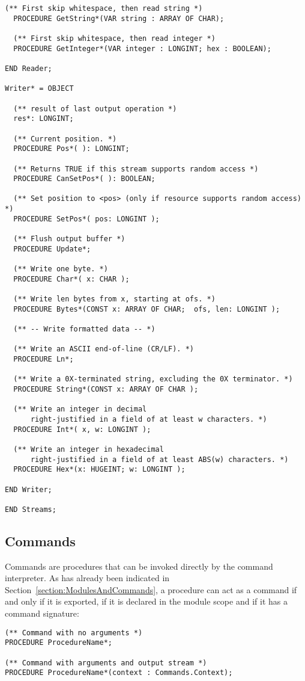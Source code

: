 \documentclass[a4paper,11pt]{article}
\begin{document}
\begin{lstlisting}[language=Oberon,frame=none,caption={Simplified Reader and Writer Interface}]
  (** First skip whitespace, then read string *)
  PROCEDURE GetString*(VAR string : ARRAY OF CHAR);

  (** First skip whitespace, then read integer *)
  PROCEDURE GetInteger*(VAR integer : LONGINT; hex : BOOLEAN);

END Reader;

Writer* = OBJECT

  (** result of last output operation *)
  res*: LONGINT;

  (** Current position. *)
  PROCEDURE Pos*( ): LONGINT;

  (** Returns TRUE if this stream supports random access *)
  PROCEDURE CanSetPos*( ): BOOLEAN;

  (** Set position to <pos> (only if resource supports random access) *)
  PROCEDURE SetPos*( pos: LONGINT );

  (** Flush output buffer *)
  PROCEDURE Update*;

  (** Write one byte. *)
  PROCEDURE Char*( x: CHAR );

  (** Write len bytes from x, starting at ofs. *)
  PROCEDURE Bytes*(CONST x: ARRAY OF CHAR;  ofs, len: LONGINT );

  (** -- Write formatted data -- *)

  (** Write an ASCII end-of-line (CR/LF). *)
  PROCEDURE Ln*;

  (** Write a 0X-terminated string, excluding the 0X terminator. *)
  PROCEDURE String*(CONST x: ARRAY OF CHAR );

  (** Write an integer in decimal
      right-justified in a field of at least w characters. *)
  PROCEDURE Int*( x, w: LONGINT );

  (** Write an integer in hexadecimal
      right-justified in a field of at least ABS(w) characters. *)
  PROCEDURE Hex*(x: HUGEINT; w: LONGINT );

END Writer;

END Streams;
\end{lstlisting}

\subsection{Commands}
Commands are procedures that can be invoked directly by the command interpreter. As has already been indicated in Section~\ref{section:ModulesAndCommands}, a procedure can act as a command if and only if it is exported, if it is declared in the module scope and if it has a command signature:
\begin{lstlisting}[language=Oberon,frame=none,caption={Command Signatures}]
(** Command with no arguments *)
PROCEDURE ProcedureName*;

(** Command with arguments and output stream *)
PROCEDURE ProcedureName*(context : Commands.Context);
\end{lstlisting}
\end{document}

